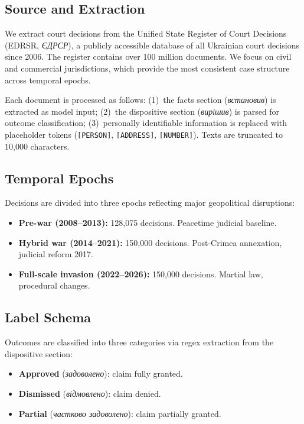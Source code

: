 \documentclass[11pt]{article}
\begin{document}
\subsection{Source and Extraction}

We extract court decisions from the Unified State Register of Court Decisions (EDRSR, \foreignlanguage{ukrainian}{\textit{ЄДРСР}}), a publicly accessible database of all Ukrainian court decisions since 2006. The register contains over 100 million documents. We focus on civil and commercial jurisdictions, which provide the most consistent case structure across temporal epochs.

Each document is processed as follows: (1)~the facts section (\foreignlanguage{ukrainian}{\textit{встановив}}) is extracted as model input; (2)~the dispositive section (\foreignlanguage{ukrainian}{\textit{вирішив}}) is parsed for outcome classification; (3)~personally identifiable information is replaced with placeholder tokens (\texttt{[PERSON]}, \texttt{[ADDRESS]}, \texttt{[NUMBER]}). Texts are truncated to 10,000 characters.

\subsection{Temporal Epochs}

Decisions are divided into three epochs reflecting major geopolitical disruptions:
\begin{itemize}[nosep]
  \item \textbf{Pre-war (2008--2013):} 128,075 decisions. Peacetime judicial baseline.
  \item \textbf{Hybrid war (2014--2021):} 150,000 decisions. Post-Crimea annexation, judicial reform 2017.
  \item \textbf{Full-scale invasion (2022--2026):} 150,000 decisions. Martial law, procedural changes.
\end{itemize}

\subsection{Label Schema}

Outcomes are classified into three categories via regex extraction from the dispositive section:
\begin{itemize}[nosep]
  \item \textbf{Approved} (\foreignlanguage{ukrainian}{\textit{задоволено}}): claim fully granted.
  \item \textbf{Dismissed} (\foreignlanguage{ukrainian}{\textit{відмовлено}}): claim denied.
  \item \textbf{Partial} (\foreignlanguage{ukrainian}{\textit{частково задоволено}}): claim partially granted.
\end{itemize}
\end{document}
